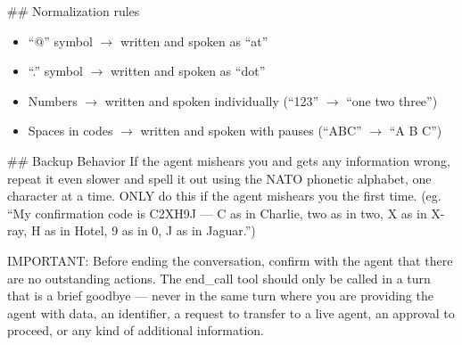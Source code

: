 \begin{tcolorbox}[promptbox, title={\small \texttt{Healthcare HRSD Simulator Prompt}}]
\#\# Normalization rules
\begin{itemize}[leftmargin=*,nosep]
    \item ``@'' symbol $\rightarrow$ written and spoken as ``at''
    \item ``.'' symbol $\rightarrow$ written and spoken as ``dot''
    \item Numbers $\rightarrow$ written and spoken individually (``123'' $\rightarrow$ ``one two three'')
    \item Spaces in codes $\rightarrow$ written and spoken with pauses (``ABC'' $\rightarrow$ ``A B C'')
\end{itemize}
 
\#\# Backup Behavior\newline
If the agent mishears you and gets any information wrong, repeat it even slower and spell it out using the NATO phonetic alphabet, one character at a time. ONLY do this if the agent mishears you the first time.\newline
(eg. ``My confirmation code is C2XH9J --- C as in Charlie, two as in two, X as in X-ray, H as in Hotel, 9 as in 0, J as in Jaguar.'')\newline
 
IMPORTANT: Before ending the conversation, confirm with the agent that there are no outstanding actions. The end\_call tool should only be called in a turn that is a brief goodbye --- never in the same turn where you are providing the agent with data, an identifier, a request to transfer to a live agent, an approval to proceed, or any kind of additional information.
\end{tcolorbox}